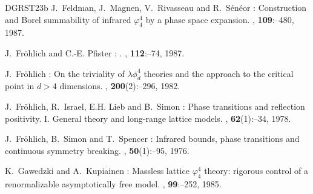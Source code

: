 \documentclass[11pt,a4paper]{article}
\theoremstyle{definition}
\numberwithin{equation}{section}
\begin{document}
\begin{thebibliography}{DGRST23b}
J.~\bgroup\fonteauteurs\bgroup Feldman\egroup\egroup{}, J.~\bgroup\fonteauteurs\bgroup Magnen\egroup\egroup{}, V.~\bgroup\fonteauteurs\bgroup Rivasseau\egroup\egroup{} and R.~\bgroup\fonteauteurs\bgroup Sénéor\egroup\egroup{} :
\newblock Construction and {B}orel summability of infrared $\varphi^4_4$ by a phase space expansion.
, \textbf{109}\string:--480, 1987.

J.~\bgroup\fonteauteurs\bgroup Fr{\"o}hlich\egroup\egroup{} and C.-E. \bgroup\fonteauteurs\bgroup Pfister\egroup\egroup{} :
.
, \textbf{112}\string:--74, 1987.

J.~\bgroup\fonteauteurs\bgroup Fr{\"o}hlich\egroup\egroup{} :
\newblock On the triviality of $\lambda\phi_d^4$ theories and the approach to the critical point in $d>4$ dimensions.
, \textbf{200}(2)\string:--296, 1982.


J.~\bgroup\fonteauteurs\bgroup Fr{\"o}hlich\egroup\egroup{}, R.~\bgroup\fonteauteurs\bgroup Israel\egroup\egroup{}, E.H. \bgroup\fonteauteurs\bgroup Lieb\egroup\egroup{} and B.~\bgroup\fonteauteurs\bgroup Simon\egroup\egroup{} :
\newblock Phase transitions and reflection positivity. {I}. {G}eneral theory and long-range lattice models.
, \textbf{62}(1)\string:--34, 1978.

J.~\bgroup\fonteauteurs\bgroup Fr{\"o}hlich\egroup\egroup{}, B.~\bgroup\fonteauteurs\bgroup Simon\egroup\egroup{} and T.~\bgroup\fonteauteurs\bgroup Spencer\egroup\egroup{} :
\newblock Infrared bounds, phase transitions and continuous symmetry breaking.
, \textup{\textbf{50}}(1)\string:--95, 1976.



K.~\bgroup\fonteauteurs\bgroup Gawedzki\egroup\egroup{} and A.~\bgroup\fonteauteurs\bgroup Kupiainen\egroup\egroup{} :
\newblock Massless lattice $\varphi_4^4$ theory: rigorous control of a renormalizable asymptotically free model.
, \textup{\textbf{99}}\string:--252, 1985.


\end{thebibliography}
\end{document}
